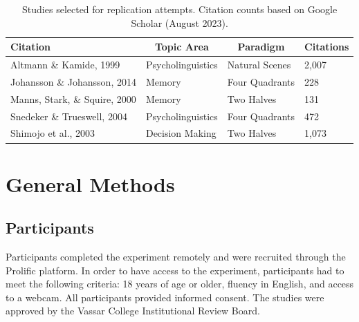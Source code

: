 \documentclass[
  man,floatsintext]{apa6}
\begin{document}
\begin{table}[tbp]

\begin{center}
\begin{threeparttable}

\caption{\label{tab:studies-table}Studies selected for replication attempts. Citation counts based on Google Scholar (August 2023).}

\small{

\begin{tabular}{llll}
\toprule
Citation & \multicolumn{1}{c}{Topic Area} & \multicolumn{1}{c}{Paradigm} & \multicolumn{1}{c}{Citations}\\
\midrule
Altmann \& Kamide, 1999 & Psycholinguistics & Natural Scenes & 2,007\\
Johansson \& Johansson, 2014 & Memory & Four Quadrants & 228\\
Manns, Stark, \& Squire, 2000 & Memory & Two Halves & 131\\
Snedeker \& Trueswell, 2004 & Psycholinguistics & Four Quadrants & 472\\
Shimojo et al., 2003 & Decision Making & Two Halves & 1,073\\
\bottomrule
\end{tabular}

}

\end{threeparttable}
\end{center}

\end{table}

\hypertarget{general-methods}{%
\section{General Methods}\label{general-methods}}

\hypertarget{participants}{%
\subsection{Participants}\label{participants}}

Participants completed the experiment remotely and were recruited
through the Prolific platform. In order to have access to the
experiment, participants had to meet the following criteria: 18 years of
age or older, fluency in English, and access to a webcam. All
participants provided informed consent. The studies were approved by the
Vassar College Institutional Review Board.
\end{document}
